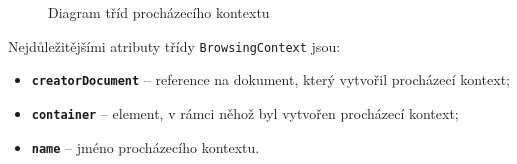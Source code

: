 \begin{figure}[H]
  \begin{center}
    \caption{Diagram tříd procházecího kontextu}
    \label{Figure.BrowsingContext}
  \end{center}
\end{figure}

\noindent Nejdůležitějšími atributy třídy \texttt{BrowsingContext} jsou:

\begin{itemize}
  \item \textbf{\texttt{creatorDocument}} -- reference na dokument, který vytvořil procházecí kontext;
  \item \textbf{\texttt{container}} -- element, v rámci něhož byl vytvořen procházecí kontext;
  \item \textbf{\texttt{name}} -- jméno procházecího kontextu.
\end{itemize}

